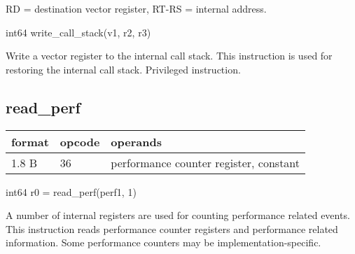 \documentclass[forwardcom.tex]{subfiles}
\begin{document}
RD = destination vector register, RT-RS = internal address.
\vv

int64 write\_call\_stack(v1, r2, r3)
\vv

Write a vector register to the internal call stack. This instruction is used for restoring the internal call stack.
Privileged instruction.
\vv


\subsection{read\_perf}
\label{table:readPerfInstruction}
\begin{tabular}{|p{12mm}|p{15mm}|p{100mm}|}
\hline
\bfseries format & \bfseries opcode & \bfseries operands \\ \hline
1.8 B & 36 & performance counter register, constant \\ \hline
\end{tabular}
\vv

int64 r0 = read\_perf(perf1, 1)
\vv

A number of internal registers are used for counting performance related events. 
This instruction reads performance counter registers and performance related information. Some performance counters may be implementation-specific.
\vv
\end{document}
